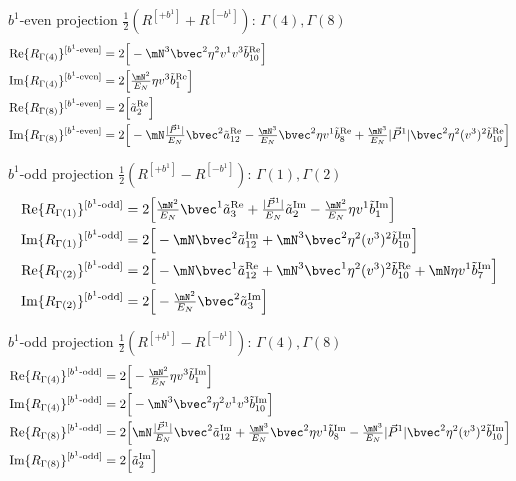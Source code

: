 \begin{frame}{$b^1$-even projection $\tfrac12(R^{[+b^1]}+R^{[-b^1]})$: $\Gamma(4),\Gamma(8)$}
  \small
  \begin{align*}
    \Rr{Re}{4}{b^1\text{-even}}&=2\Big[-\mN^3\bvec^2\eta^2v^1v^3\bR{10}\Big]\\
    \Rr{Im}{4}{b^1\text{-even}}&=2\Big[\tfrac{\mN^2}{\En}\eta v^3\bR1\Big]\\
    \Rr{Re}{8}{b^1\text{-even}}&=2\Big[\aR2\Big]\\
    \Rr{Im}{8}{b^1\text{-even}}&=2\Big[-\mN\tfrac{\Pa}{\En}\bvec^2\aR{12}-\tfrac{\mN^3}{\En}\bvec^2\eta v^1\bR8+\tfrac{\mN^3}{\En}\Pa\bvec^2\eta^2(v^3)^2\bR{10}\Big]
  \end{align*}
\end{frame}

\begin{frame}{$b^1$-odd projection $\tfrac12(R^{[+b^1]}-R^{[-b^1]})$: $\Gamma(1),\Gamma(2)$}
  \small
  \begin{align*}
    \Rr{Re}{1}{b^1\text{-odd}}&=2\Big[\tfrac{\mN^2}{\En}\bvec^1\aR3+\tfrac{\Pa}{\En}\aI2-\tfrac{\mN^2}{\En}\eta v^1\bI1\Big]\\
    \Rr{Im}{1}{b^1\text{-odd}}&=2\Big[-\mN\bvec^2\aI{12}+\mN^3\bvec^2\eta^2(v^3)^2\bI{10}\Big]\\
    \Rr{Re}{2}{b^1\text{-odd}}&=2\Big[-\mN\bvec^1\aR{12}+\mN^3\bvec^1\eta^2(v^3)^2\bR{10}+\mN\eta v^1\bI7\Big]\\
    \Rr{Im}{2}{b^1\text{-odd}}&=2\Big[-\tfrac{\mN^2}{\En}\bvec^2\aI3\Big]
  \end{align*}
\end{frame}

\begin{frame}{$b^1$-odd projection $\tfrac12(R^{[+b^1]}-R^{[-b^1]})$: $\Gamma(4),\Gamma(8)$}
  \small
  \begin{align*}
    \Rr{Re}{4}{b^1\text{-odd}}&=2\Big[-\tfrac{\mN^2}{\En}\eta v^3\bI1\Big]\\
    \Rr{Im}{4}{b^1\text{-odd}}&=2\Big[-\mN^3\bvec^2\eta^2v^1v^3\bI{10}\Big]\\
    \Rr{Re}{8}{b^1\text{-odd}}&=2\Big[\mN\tfrac{\Pa}{\En}\bvec^2\aI{12}+\tfrac{\mN^3}{\En}\bvec^2\eta v^1\bI8-\tfrac{\mN^3}{\En}\Pa\bvec^2\eta^2(v^3)^2\bI{10}\Big]\\
    \Rr{Im}{8}{b^1\text{-odd}}&=2\Big[\aI2\Big]
  \end{align*}
\end{frame}

